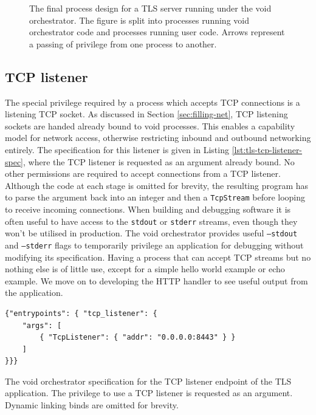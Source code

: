 \documentclass[12pt,a4paper,twoside]{report}
\begin{document}
\begin{figure}
    \centering
    

    \caption{The final process design for a TLS server running under the void orchestrator. The figure is split into processes running void orchestrator code and processes running user code. Arrows represent a passing of privilege from one process to another.}
    \label{fig:tls-server-processes}
\end{figure}

\subsection{TCP listener}
\label{sec:building-tls-tcp-listener}

The special privilege required by a process which accepts TCP connections is a listening TCP socket. As discussed in Section \ref{sec:filling-net}, TCP listening sockets are handed already bound to void processes. This enables a capability model for network access, otherwise restricting inbound and outbound networking entirely. The specification for this listener is given in Listing \ref{lst:tls-tcp-listener-spec}, where the TCP listener is requested as an argument already bound. No other permissions are required to accept connections from a TCP listener. Although the code at each stage is omitted for brevity, the resulting program has to parse the argument back into an integer and then a \texttt{TcpStream} before looping to receive incoming connections. When building and debugging software it is often useful to have access to the \texttt{stdout} or \texttt{stderr} streams, even though they won't be utilised in production. The void orchestrator provides useful \texttt{--stdout} and \texttt{--stderr} flags to temporarily privilege an application for debugging without modifying its specification. Having a process that can accept TCP streams but no nothing else is of little use, except for a simple hello world example or echo example. We move on to developing the HTTP handler to see useful output from the application.

\begin{listing}
\begin{verbatim}
{"entrypoints": { "tcp_listener": {
	"args": [
		{ "TcpListener": { "addr": "0.0.0.0:8443" } }
	]
}}}
\end{verbatim}

\caption{The void orchestrator specification for the TCP listener endpoint of the TLS application. The privilege to use a TCP listener is requested as an argument. Dynamic linking binds are omitted for brevity.}
\label{lst:tls-tcp-listener-spec}
\end{listing}
\end{document}
